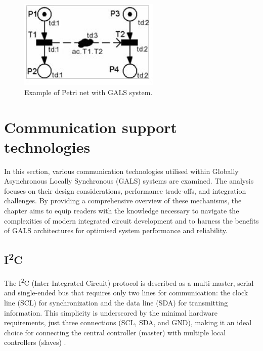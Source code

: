 \begin{figure}[htbp]
  \centering
  \includegraphics[width=0.6\textwidth]{Chapters/Figures/petrigals.jpg}
  \caption{Example of Petri net with GALS system.}
  \label{fig:petrigals}
\end{figure}


\section{Communication support technologies}
\label{sec:communication_support_technologies}

In this section, various communication technologies utilised within Globally Asynchronous Locally Synchronous (GALS) systems are examined. The analysis focuses on their design considerations, performance trade-offs, and integration challenges. By providing a comprehensive overview of these mechanisms, the chapter aims to equip readers with the knowledge necessary to navigate the complexities of modern integrated circuit development and to harness the benefits of GALS architectures for optimised system performance and reliability.


\subsection{I\textsuperscript{2}C}
\label{subsub:i2c}

The I\textsuperscript{2}C  (Inter-Integrated Circuit) protocol is described as a multi-master, serial and single-ended bus that requires only two lines for communication: the clock line (SCL) for synchronization and the data line (SDA) for transmitting information. This simplicity is underscored by the minimal hardware requirements, just three connections (SCL, SDA, and GND), making it an ideal choice for connecting the central controller (master) with multiple local controllers (slaves) \cite{i2c}.

